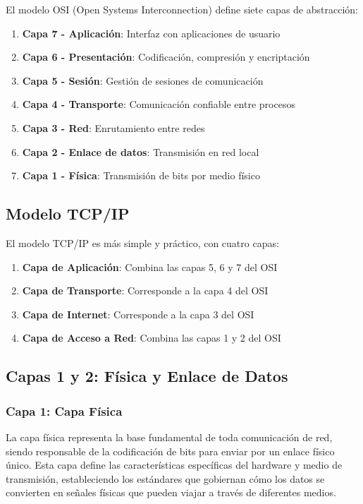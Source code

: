 El modelo OSI (Open Systems Interconnection) define siete capas de abstracción:

\begin{enumerate}
    \item \textbf{Capa 7 - Aplicación}: Interfaz con aplicaciones de usuario
    \item \textbf{Capa 6 - Presentación}: Codificación, compresión y encriptación
    \item \textbf{Capa 5 - Sesión}: Gestión de sesiones de comunicación
    \item \textbf{Capa 4 - Transporte}: Comunicación confiable entre procesos
    \item \textbf{Capa 3 - Red}: Enrutamiento entre redes
    \item \textbf{Capa 2 - Enlace de datos}: Transmisión en red local
    \item \textbf{Capa 1 - Física}: Transmisión de bits por medio físico
\end{enumerate}

\subsection{Modelo TCP/IP}

El modelo TCP/IP es más simple y práctico, con cuatro capas:

\begin{enumerate}
    \item \textbf{Capa de Aplicación}: Combina las capas 5, 6 y 7 del OSI
    \item \textbf{Capa de Transporte}: Corresponde a la capa 4 del OSI
    \item \textbf{Capa de Internet}: Corresponde a la capa 3 del OSI
    \item \textbf{Capa de Acceso a Red}: Combina las capas 1 y 2 del OSI
\end{enumerate}

\subsection{Capas 1 y 2: Física y Enlace de Datos}

\subsubsection{Capa 1: Capa Física}

La capa física representa la base fundamental de toda comunicación de red, siendo responsable de la codificación de bits para enviar por un enlace físico único. Esta capa define las características específicas del hardware y medio de transmisión, estableciendo los estándares que gobiernan cómo los datos se convierten en señales físicas que pueden viajar a través de diferentes medios.


